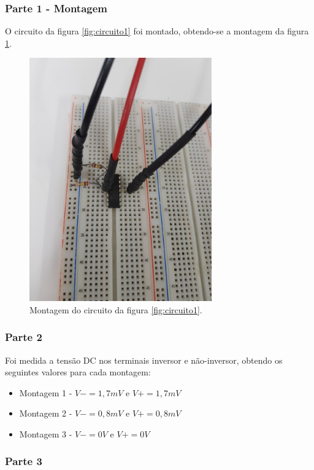 \documentclass{abntex2}
\begin{document}
\subsubsection{Parte 1 - Montagem}

O circuito da figura \ref{fig:circuito1} foi montado, obtendo-se a montagem da figura \ref{fig:montagem1}.

\begin{figure}[h]
  \centering
  \includegraphics[width = 0.7\textwidth]{circ_0.jpg}
  \caption{Montagem do circuito da figura \ref{fig:circuito1}.}
  \label{fig:montagem1}
\end{figure}

\subsubsection{Parte 2}

  Foi medida a tensão DC nos terminais inversor e não-inversor, obtendo os seguintes valores para cada montagem:
  \begin{itemize}
    \item Montagem 1 - $V- = 1,7mV$ e $V+ = 1,7mV$
    \item Montagem 2 - $V- = 0,8mV$ e $V+ = 0,8mV$
    \item Montagem 3 - $V- = 0V$ e $V+ = 0V$
  \end{itemize}

\subsubsection{Parte 3}
\end{document}
